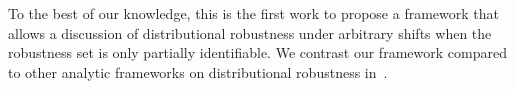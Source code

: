 

To the best of our knowledge, this is the first work
to propose a framework that allows a discussion of distributional robustness under arbitrary shifts when the robustness set
is only partially identifiable. We contrast our framework compared to other analytic frameworks on distributional robustness in~. 

